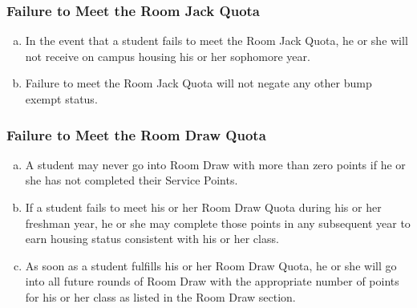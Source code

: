 \documentclass[USletter,12pt]{article}
\begin{document}

\subsubsection{Failure to Meet the Room Jack Quota}
\begin{enumerate}[(a)]
\item In the event that a student fails to meet the Room Jack Quota, he or she will not receive on campus housing his or her sophomore year.
\item Failure to meet the Room Jack Quota will not negate any other bump exempt status.
\end{enumerate}

\subsubsection{Failure to Meet the Room Draw Quota}
\begin{enumerate}[(a)]
\item A student may never go into Room Draw with more than zero points if he or she has not completed their Service Points.
\item If a student fails to meet his or her Room Draw Quota during his or her freshman year, he or she may complete those points in any subsequent year to earn housing status consistent with his or her class.
\item As soon as a student fulfills his or her Room Draw Quota, he or she will go into all future rounds of Room Draw with the appropriate number of points for his or her class as listed in the Room Draw section.
\end{enumerate}
\end{document}
